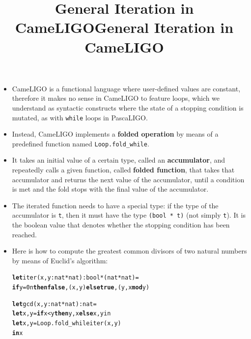 \documentclass[wide]{slides}
\newcommand{\Kelse}[0]{\textbf{else}\xspace}
\newcommand{\Kif}[0]{\textbf{if}\xspace}
\newcommand{\Kin}[0]{\textbf{in}\xspace}
\newcommand{\Kmod}[0]{\textbf{mod}\xspace}
\newcommand{\Kthen}[0]{\textbf{then}\xspace}
\newcommand{\Kfalse}[0]{\textbf{false}\xspace}
\newcommand{\Klet}[0]{\textbf{let}\xspace}
\newcommand{\Ktrue}[0]{\textbf{true}\xspace}
\begin{document}
\begin{slide}
  \title{General Iteration in CameLIGO}

  \begin{itemize}

    \item CameLIGO is a functional language where user-defined values
      are constant, therefore it makes no sense in CameLIGO to feature
      loops, which we understand as syntactic constructs where the
      state of a stopping condition is mutated, as with \texttt{while}
      loops in PascaLIGO.

    \item Instead, CameLIGO implements a \textbf{folded operation} by
      means of a predefined function named \texttt{Loop.fold\_while}.

    \item It takes an initial value of a certain type, called an
      \textbf{accumulator}, and repeatedly calls a given function,
      called \textbf{folded function}, that takes that accumulator
      and returns the next value of the accumulator, until a condition
      is met and the fold stops with the final value of the
      accumulator.

    \item The iterated function needs to have a special type: if the
      type of the accumulator is \texttt{t}, then it must have the
      type \texttt{(bool * t)} (not simply \texttt{t}). It is the
      boolean value that denotes whether the stopping condition has
      been reached.

  \end{itemize}

\end{slide}

\begin{slide}
  \title{General Iteration in CameLIGO}

  \begin{itemize}

    \item Here is how to compute the greatest common divisors of two
      natural numbers by means of Euclid's algorithm:
    \begin{alltt}
\Klet iter (x,y : nat * nat) : bool * (nat * nat) =
  \Kif y = 0n \Kthen \Kfalse, (x,y) \Kelse \Ktrue, (y, x \Kmod y)

\Klet gcd (x,y : nat * nat) : nat =
  \Klet x,y = \Kif x < y \Kthen y,x \Kelse x,y in
  \Klet x,y = Loop.fold\_while iter (x,y)
  \Kin x
    \end{alltt}

  \end{itemize}

\end{slide}
\end{document}
